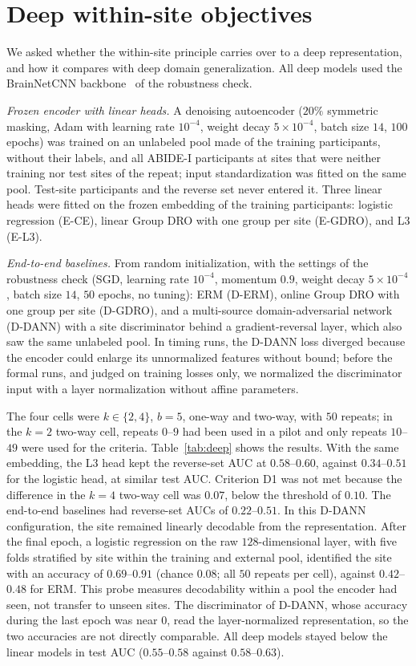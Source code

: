 \section{Deep within-site objectives}\label{app:deep}

We asked whether the within-site principle carries over to a deep representation, and how it compares with deep domain generalization. All deep models used the BrainNetCNN backbone~\cite{kawahara2017} of the robustness check.

\emph{Frozen encoder with linear heads.} A denoising autoencoder ($20\%$ symmetric masking, Adam with learning rate $10^{-4}$, weight decay $5\times10^{-4}$, batch size $14$, $100$ epochs) was trained on an unlabeled pool made of the training participants, without their labels, and all ABIDE-I participants at sites that were neither training nor test sites of the repeat; input standardization was fitted on the same pool. Test-site participants and the reverse set never entered it. Three linear heads were fitted on the frozen embedding of the training participants: logistic regression (E-CE), linear Group DRO with one group per site (E-GDRO), and L3 (E-L3).

\emph{End-to-end baselines.} From random initialization, with the settings of the robustness check (SGD, learning rate $10^{-4}$, momentum $0.9$, weight decay $5\times10^{-4}$, batch size $14$, $50$ epochs, no tuning): ERM (D-ERM), online Group DRO with one group per site (D-GDRO), and a multi-source domain-adversarial network~\cite{ganin2016} (D-DANN) with a site discriminator behind a gradient-reversal layer, which also saw the same unlabeled pool. In timing runs, the D-DANN loss diverged because the encoder could enlarge its unnormalized features without bound; before the formal runs, and judged on training losses only, we normalized the discriminator input with a layer normalization without affine parameters.

The four cells were $k\in\{2,4\}$, $b=5$, one-way and two-way, with $50$ repeats; in the $k=2$ two-way cell, repeats $0$--$9$ had been used in a pilot and only repeats $10$--$49$ were used for the criteria. Table~\ref{tab:deep} shows the results. With the same embedding, the L3 head kept the reverse-set AUC at $0.58$--$0.60$, against $0.34$--$0.51$ for the logistic head, at similar test AUC. Criterion D1 was not met because the difference in the $k=4$ two-way cell was $0.07$, below the threshold of $0.10$. The end-to-end baselines had reverse-set AUCs of $0.22$--$0.51$. In this D-DANN configuration, the site remained linearly decodable from the representation. After the final epoch, a logistic regression on the raw $128$-dimensional layer, with five folds stratified by site within the training and external pool, identified the site with an accuracy of $0.69$--$0.91$ (chance $0.08$; all $50$ repeats per cell), against $0.42$--$0.48$ for ERM. This probe measures decodability within a pool the encoder had seen, not transfer to unseen sites. The discriminator of D-DANN, whose accuracy during the last epoch was near $0$, read the layer-normalized representation, so the two accuracies are not directly comparable. All deep models stayed below the linear models in test AUC ($0.55$--$0.58$ against $0.58$--$0.63$).

